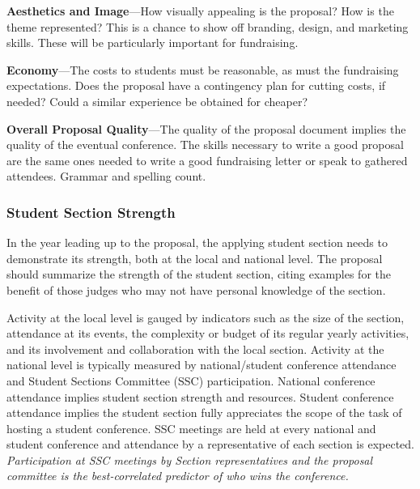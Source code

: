 \documentclass[12pt]{article}
\begin{document}
\textbf{Aesthetics and Image}---How visually appealing is the proposal? How is the theme represented? This is a chance to show off branding, design, and marketing skills. These will be particularly important for fundraising.

\textbf{Economy}---The costs to students must be reasonable, as must the fundraising expectations. Does the proposal have a contingency plan for cutting costs, if needed? Could a similar experience be obtained for cheaper?

\textbf{Overall Proposal Quality}---The quality of the proposal document implies the quality of the eventual conference. The skills necessary to write a good proposal are the same ones needed to write a good fundraising letter or speak to gathered attendees. Grammar and spelling count.

\subsubsection{Student Section Strength}
In the year leading up to the proposal, the applying student section needs to demonstrate its strength, both at the local and national level. The proposal should summarize the strength of the student section, citing examples for the benefit of those judges who may not have personal knowledge of the section.

Activity at the local level is gauged by indicators such as the size of the section, attendance at its events, the complexity or budget of its regular yearly activities, and its involvement and collaboration with the local section. 
Activity at the national level is typically measured by national/student conference attendance and Student Sections Committee (SSC) participation. National conference attendance implies student section strength and resources. 
Student conference attendance implies the student section fully appreciates the scope of the task of hosting a student conference. 
SSC meetings are held at every national and student conference and attendance by a representative of each section is expected.
\textit{Participation at SSC meetings by Section representatives and the
proposal committee is the best-correlated predictor of who wins the conference.}
\end{document}
